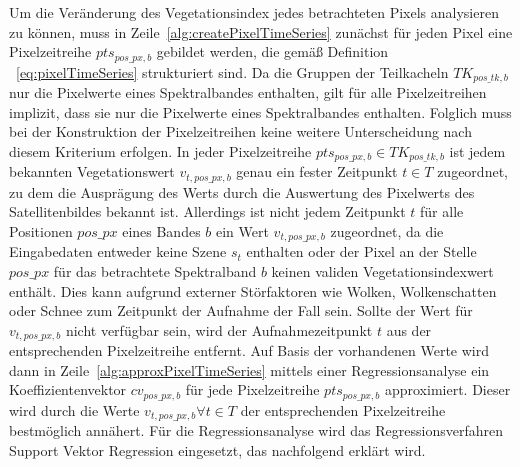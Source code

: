 Um die Veränderung des Vegetationsindex jedes betrachteten Pixels analysieren zu können, muss in Zeile~\ref{alg:createPixelTimeSeries} zunächst für jeden Pixel eine Pixelzeitreihe $pts_{pos\_px, b}$ gebildet werden, die gemäß Definition ~\ref{eq:pixelTimeSeries} strukturiert sind. Da die Gruppen der Teilkacheln $TK_{pos\_tk, b}$ nur die Pixelwerte eines Spektralbandes enthalten, gilt für alle Pixelzeitreihen implizit, dass sie nur die Pixelwerte eines Spektralbandes enthalten. Folglich muss bei der Konstruktion der Pixelzeitreihen keine weitere Unterscheidung nach diesem Kriterium erfolgen. In jeder Pixelzeitreihe $pts_{pos\_px, b} \in TK_{pos\_tk, b}$ ist jedem bekannten Vegetationswert $v_{t, pos\_px, b}$ genau ein fester Zeitpunkt $t \in T$ zugeordnet, zu dem die Ausprägung des Werts durch die Auswertung des Pixelwerts des Satellitenbildes bekannt ist. Allerdings ist nicht jedem Zeitpunkt $t$ für alle Positionen $pos\_px$ eines Bandes $b$ ein Wert $v_{t, pos\_px, b}$ zugeordnet, da die Eingabedaten entweder keine Szene $s_t$  enthalten oder der Pixel an der Stelle $pos\_px$ für das betrachtete Spektralband $b$ keinen validen Vegetationsindexwert enthält. Dies kann aufgrund externer Störfaktoren wie Wolken, Wolkenschatten oder Schnee zum Zeitpunkt der Aufnahme der Fall sein. Sollte der Wert für $v_{t, pos\_px, b}$ nicht verfügbar sein, wird der Aufnahmezeitpunkt $t$ aus der entsprechenden Pixelzeitreihe entfernt. Auf Basis der vorhandenen Werte wird dann in Zeile~\ref{alg:approxPixelTimeSeries} mittels einer Regressionsanalyse ein Koeffizientenvektor $cv_{pos\_px, b}$  für jede Pixelzeitreihe $pts_{pos\_px, b}$ approximiert. Dieser wird durch die Werte $v_{t, pos\_px, b} \forall t \in T$ der entsprechenden Pixelzeitreihe bestmöglich annähert. Für die Regressionsanalyse wird das Regressionsverfahren Support Vektor Regression eingesetzt, das nachfolgend erklärt wird. \\

